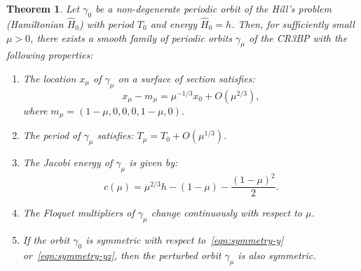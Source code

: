 \documentclass[pdflatex,sn-mathphys-ay]{sn-jnl}%
\theoremstyle{thmstyleone}%
\newtheorem{theorem}{Theorem}%
\theoremstyle{thmstyletwo}%
\theoremstyle{thmstylethree}%
\begin{document}
\begin{theorem}
    \label{thm:C0_perturbation}
    Let $\gamma_0$ be a non-degenerate periodic orbit of the Hill's problem (Hamiltonian $\hat{H}_0$) with period $T_0$ and energy $\hat{H}_0 = h$. Then, for sufficiently small $\mu > 0$, there exists a smooth family of periodic orbits $\gamma_\mu$ of the CR3BP with the following properties:
    \begin{enumerate}
        \item The location $x_\mu$ of $\gamma_\mu$ on a surface of section satisfies:
        \[
        x_\mu - m_\mu = \mu^{-1/3} x_0 + O(\mu^{2/3}),
        \]
        where $m_\mu = (1 - \mu, 0, 0, 0, 1 - \mu, 0)$.
        \item The period of $\gamma_\mu$ satisfies:
        $
        T_\mu = T_0 + O(\mu^{1/3}).
        $
        \item The Jacobi energy of $\gamma_\mu$ is given by:
        \[
        c(\mu) = \mu^{2/3} h - (1 - \mu) - \frac{(1 - \mu)^2}{2}.
        \]
        \item The Floquet multipliers of $\gamma_\mu$ change continuously with respect to $\mu$.
        \item If the orbit $\gamma_0$ is symmetric with respect to~\eqref{eqn:symmetry-y} or~\eqref{eqn:symmetry-yz}, then the perturbed orbit $\gamma_\mu$ is also symmetric.
    \end{enumerate}
\end{theorem}
\end{document}
